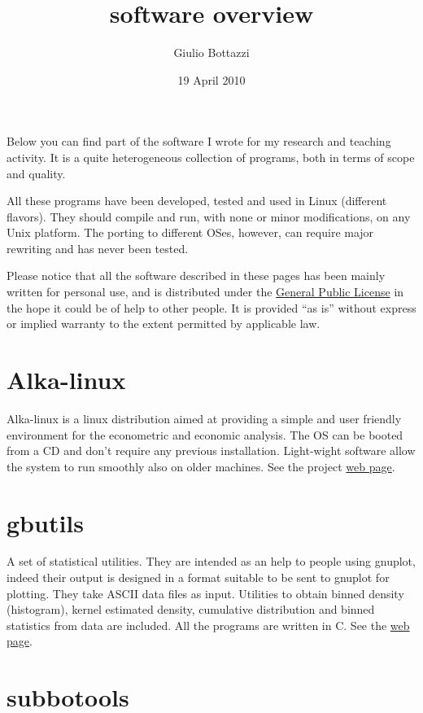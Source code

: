 \documentclass[11pt]{article}
\title{software overview}
\author{Giulio Bottazzi}
\date{19 April 2010}
\begin{document}
\maketitle

\setcounter{tocdepth}{3}
\tableofcontents
\vspace*{1cm}

Below you can find part of the software I wrote for my research and
teaching activity. It is a quite heterogeneous collection of programs,
both in terms of scope and quality.

All these programs have been developed, tested and used in Linux
(different flavors). They should compile and run, with none or minor
modifications, on any Unix platform. The porting to different OSes,
however, can require major rewriting and has never been tested.

Please notice that all the software described in these pages has been
mainly written for personal use, and is distributed under the \href{http://www.gnu.org/copyleft/gpl.html}{General Public License} in the hope it could be of help to other people. It is
provided ``as is'' without express or implied warranty to the extent
permitted by applicable law.

\section{Alka-linux}
\label{sec-1}


Alka-linux is a linux distribution aimed at providing a simple and
user friendly environment for the econometric and economic
analysis. The OS can be booted from a CD and don't require any
previous installation. Light-wight software allow the system to run
smoothly also on older machines. See the project \href{http://www.alka-linux.sssup.it/}{web page}.
\section{gbutils}
\label{sec-2}


A set of statistical utilities. They are intended as an help to people
using gnuplot, indeed their output is designed in a format suitable to
be sent to gnuplot for plotting. They take ASCII data files as
input. Utilities to obtain binned density (histogram), kernel
estimated density, cumulative distribution and binned statistics from
data are included. All the programs are written in C.  See the \href{http://www.cafed.sssup.it/software/gbutils/gbutils.html}{web page}.
\section{subbotools}
\label{sec-3}
\end{document}
